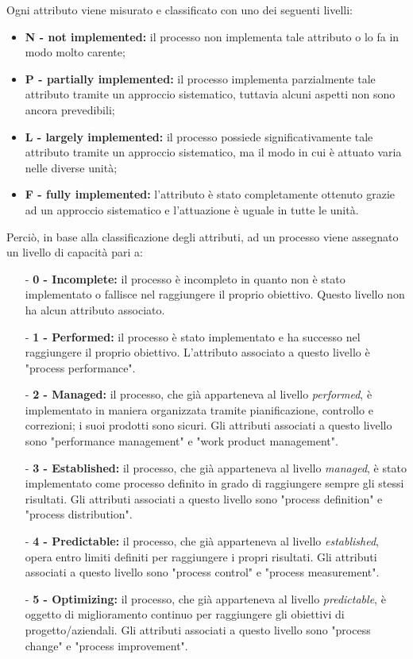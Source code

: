 Ogni attributo viene misurato e classificato con uno dei seguenti livelli:
\begin{itemize}
	\item \textbf{N - not implemented:} il processo non implementa tale attributo o lo fa in modo molto carente;
	\item \textbf{P - partially implemented:} il processo implementa parzialmente tale attributo 
		tramite un approccio sistematico, tuttavia alcuni aspetti non sono ancora prevedibili;
	\item \textbf{L - largely implemented:} il processo possiede significativamente tale attributo 
		tramite un approccio sistematico, ma il modo in cui è attuato varia nelle diverse unità;
	\item \textbf{F - fully implemented:} l'attributo è stato completamente ottenuto grazie ad un approccio sistematico 
		e l'attuazione è uguale in tutte le unità.
\end{itemize}
Perciò, in base alla classificazione degli attributi, ad un processo viene assegnato un livello di capacità pari a:
\begin{itemize}
	\item[-] \textbf{0 - Incomplete:} il processo è incompleto in quanto non è stato implementato o 
		fallisce nel raggiungere il proprio	obiettivo. Questo livello non ha alcun attributo associato.
	\item[-] \textbf{1 - Performed:} il processo è stato implementato e ha successo nel raggiungere il proprio obiettivo.
		L'attributo associato a questo livello è "process performance".
	\item[-] \textbf{2 - Managed:} il processo, che già apparteneva al livello \textit{performed}, è implementato in 
		maniera organizzata tramite pianificazione, controllo e correzioni; i suoi prodotti sono sicuri. 
		Gli attributi associati a questo livello sono "performance management" e "work product management".
	\item[-] \textbf{3 - Established:} il processo, che già apparteneva al livello \textit{managed},
		è stato implementato come processo definito in grado di raggiungere sempre gli stessi risultati.
		Gli attributi associati a questo livello sono "process definition" e "process distribution".
	\item[-] \textbf{4 - Predictable:} il processo, che già apparteneva al livello \textit{established},
		opera entro limiti definiti per raggiungere i propri risultati.
		Gli attributi associati a questo livello sono "process control" e "process measurement".
	\item[-] \textbf{5 - Optimizing:} il processo, che già apparteneva al livello \textit{predictable},
		è oggetto di miglioramento continuo per raggiungere gli obiettivi di progetto/aziendali.
		Gli attributi associati a questo livello sono "process change" e "process improvement".
\end{itemize}
